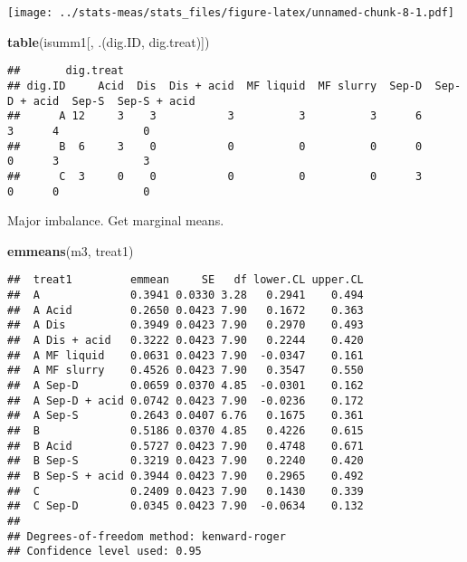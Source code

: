 \documentclass[
]{article}
\newenvironment{Shaded}{\begin{snugshade}}{\end{snugshade}}
\newcommand{\FunctionTok}[1]{\textcolor[rgb]{0.13,0.29,0.53}{\textbf{#1}}}
\newcommand{\NormalTok}[1]{#1}
\newcommand{\StringTok}[1]{\textcolor[rgb]{0.31,0.60,0.02}{#1}}
\begin{document}
\texttt{[image: ../stats-meas/stats\_files/figure-latex/unnamed-chunk-8-1.pdf]}

\begin{Shaded}
\begin{Highlighting}[]
\FunctionTok{table}\NormalTok{(isumm1[, .(dig.ID, dig.treat)])}
\end{Highlighting}
\end{Shaded}

\begin{verbatim}
##       dig.treat
## dig.ID     Acid  Dis  Dis + acid  MF liquid  MF slurry  Sep-D  Sep-D + acid  Sep-S  Sep-S + acid
##      A 12     3    3           3          3          3      6             3      4             0
##      B  6     3    0           0          0          0      0             0      3             3
##      C  3     0    0           0          0          0      3             0      0             0
\end{verbatim}

Major imbalance. Get marginal means.

\begin{Shaded}
\begin{Highlighting}[]
\FunctionTok{emmeans}\NormalTok{(m3, }\StringTok{\textquotesingle{}treat1\textquotesingle{}}\NormalTok{)}
\end{Highlighting}
\end{Shaded}

\begin{verbatim}
##  treat1         emmean     SE   df lower.CL upper.CL
##  A              0.3941 0.0330 3.28   0.2941    0.494
##  A Acid         0.2650 0.0423 7.90   0.1672    0.363
##  A Dis          0.3949 0.0423 7.90   0.2970    0.493
##  A Dis + acid   0.3222 0.0423 7.90   0.2244    0.420
##  A MF liquid    0.0631 0.0423 7.90  -0.0347    0.161
##  A MF slurry    0.4526 0.0423 7.90   0.3547    0.550
##  A Sep-D        0.0659 0.0370 4.85  -0.0301    0.162
##  A Sep-D + acid 0.0742 0.0423 7.90  -0.0236    0.172
##  A Sep-S        0.2643 0.0407 6.76   0.1675    0.361
##  B              0.5186 0.0370 4.85   0.4226    0.615
##  B Acid         0.5727 0.0423 7.90   0.4748    0.671
##  B Sep-S        0.3219 0.0423 7.90   0.2240    0.420
##  B Sep-S + acid 0.3944 0.0423 7.90   0.2965    0.492
##  C              0.2409 0.0423 7.90   0.1430    0.339
##  C Sep-D        0.0345 0.0423 7.90  -0.0634    0.132
## 
## Degrees-of-freedom method: kenward-roger 
## Confidence level used: 0.95
\end{verbatim}
\end{document}

